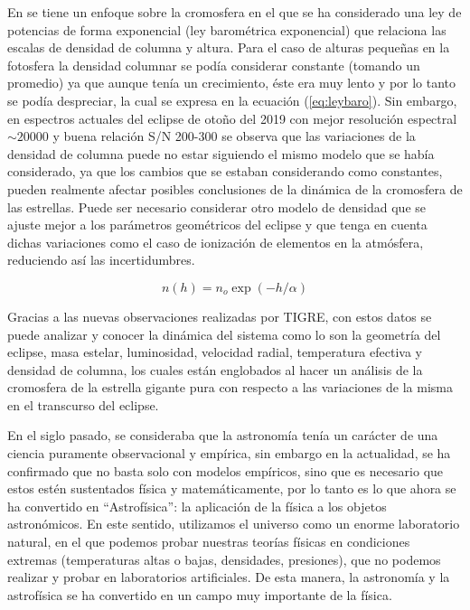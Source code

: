 \documentclass[11pt]{article}
\begin{document}
En \cite{kps1O} se tiene un enfoque sobre la cromosfera en el que se ha considerado una ley de potencias de forma exponencial (ley barométrica exponencial) que relaciona las escalas de densidad de columna y altura. Para el caso de alturas pequeñas en la fotosfera la densidad columnar se podía considerar constante (tomando un promedio) ya que aunque tenía un crecimiento, éste era muy lento y por lo tanto se podía despreciar, la cual se expresa en la ecuación (\ref{eq:leybaro}). Sin embargo, en espectros actuales del eclipse de otoño del 2019 con mejor resolución espectral $\sim 20000$ y buena relación S/N 200-300 se observa que las variaciones de la densidad de columna puede no estar siguiendo el mismo modelo que se había considerado, ya que los cambios que se estaban considerando como constantes, pueden realmente afectar posibles conclusiones de la dinámica de la cromosfera de las estrellas. Puede ser necesario considerar otro modelo de densidad que se ajuste mejor a los parámetros geométricos del eclipse y que tenga en cuenta dichas variaciones como el caso de ionización de elementos en la atmósfera, reduciendo así las incertidumbres.

\begin{equation}
    n(h) = n_o \exp{(-h/\alpha)}
    \label{eq:leybaro}
\end{equation}
\vspace{2mm}

Gracias a las nuevas observaciones realizadas por TIGRE, con estos datos se puede analizar y conocer la dinámica del sistema como lo son la geometría del eclipse, masa estelar, luminosidad, velocidad radial, temperatura efectiva y densidad de columna, los cuales están englobados al hacer un análisis de la cromosfera de la estrella gigante pura con respecto a las variaciones de la misma en el transcurso del eclipse.

En el siglo pasado, se consideraba que la astronomía tenía un carácter de una ciencia puramente observacional y empírica, sin embargo en la actualidad, se ha confirmado que no basta solo con modelos empíricos, sino que es necesario que estos estén sustentados física y matemáticamente, por lo tanto es lo que ahora se ha convertido en ``Astrofísica'': la aplicación de la física a los objetos astronómicos. En este sentido, utilizamos el universo como un enorme laboratorio natural, en el que podemos probar nuestras teorías físicas en condiciones extremas (temperaturas altas o bajas, densidades, presiones), que no podemos realizar y probar en laboratorios artificiales. De esta manera, la astronomía y la astrofísica se ha convertido en un campo muy importante de la física.
\end{document}
